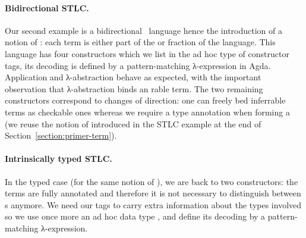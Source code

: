 \begin{center}
\end{center}

\paragraph{Bidirectional STLC.}\label{par:bidirectional} Our second example is a
bidirectional~\cite{pierce2000local} language hence the introduction of a
notion of : each term is either part of the  or
 fraction of the language. This language has four constructors
which we list in the ad hoc  type of constructor tags, its
decoding  is defined by a pattern-matching λ-expression in Agda.
Application and λ-abstraction behave as expected, with the important
observation that λ-abstraction binds an rable term. The two
remaining constructors correspond to changes of direction: one can freely
bed inferrable terms as checkable ones whereas we require a type
annotation when forming a  (we reuse the notion of  introduced
in the STLC example at the end of Section~\ref{section:primer-term}). %

\begin{center}
\begin{minipage}[t]{0.35\textwidth}
\end{minipage}\quad
\begin{minipage}[t]{0.5\textwidth}
\end{minipage}
\end{center}

\paragraph{Intrinsically typed STLC.}\label{par:intrinsicSTLC}
In the typed case (for the same notion of ), we are back to two
constructors: the terms are fully annotated and therefore it is not necessary
to distinguish between s anymore. We need our tags to carry extra
information about the types involved so we use once more an ad hoc data type
, and define its decoding  by a pattern-matching λ-expression.

